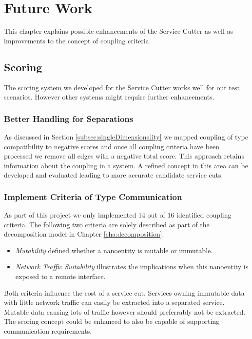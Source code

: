 \chapter{Future Work}
\label{cha:futureWork}

This chapter explains possible enhancements of the Service Cutter as well as improvements to the concept of coupling criteria.

\section{Scoring}

The scoring system we developed for the Service Cutter works well for our test scenarios. However other systems might require further enhancements.

\subsection{Better Handling for Separations}

As discussed in Section \ref{subsec:singleDimensionality} we mapped coupling of type compatibility to negative scores and once all coupling criteria have been processed we remove all edges with a negative total score. This approach retains information about the coupling in a system. A refined concept in this area can be developed and evaluated leading to more accurate candidate service cuts.

\subsection{Implement Criteria of Type Communication}

As part of this project we only implemented 14 out of 16 identified coupling criteria. The following two criteria are solely described as part of the decomposition model in Chapter \ref{cha:decomposition}.

\begin{itemize}
\item \textit{Mutability} defined whether a nanoentity is mutable or immutable.
\item \textit{Network Traffic Suitability} illustrates the implications when this nanoentity is exposed to a remote interface.
\end{itemize}

Both criteria influence the cost of a service cut. Services owning immutable data with little network traffic can easily be extracted into a separated service. Mutable data causing lots of traffic however should preferrably not be extracted. The scoring concept could be enhanced to also be capable of supporting communication requirements.


